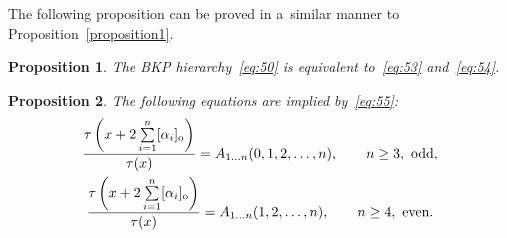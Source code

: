 \documentclass[11pt]{article}
\newtheorem{proposition}{Proposition}
\begin{document}
The following proposition can be proved in a~similar manner to Proposition~\ref{proposition1}.
\begin{proposition}\label{proposition7}
The BKP hierarchy~\eqref{eq:50} is equivalent to~\eqref{eq:53} and~\eqref{eq:54}.
\end{proposition}
\begin{proposition}\label{proposition8}
The following equations are implied by~\eqref{eq:55}:
\begin{gather}
\frac{\tau\left(x+2\sum\limits_{i=1}^{n}[\alpha_i]_{\rm o}\right)}{\tau(x)}=A_{1\dots n}(0,1,2,\dots,n),\qquad n\ge3, \ \text{odd},
\label{eq:66}
\\
\frac{\tau\left(x+2\sum\limits_{i=1}^{n}[\alpha_i]_{\rm o}\right)}{\tau(x)}=A_{1\dots n}(1,2,\dots,n),\qquad n\ge4, \ \text{even}.
\label{eq:67}
\end{gather}
\end{proposition}
\end{document}
